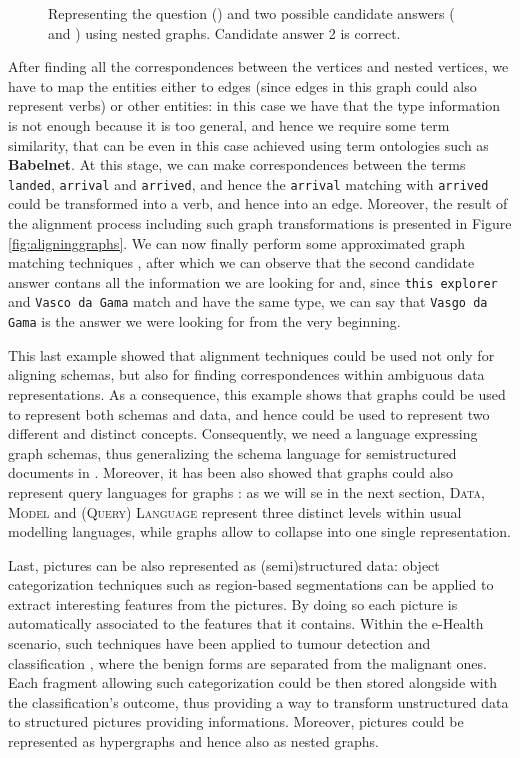 \begin{example}
\begin{figure}[!p]
	\caption{Representing the question () and two possible candidate answers ( and ) using nested graphs. Candidate answer 2 is correct.}
	\label{fig:firstnested}
\end{figure}
	After finding all the correspondences between the vertices and nested vertices, we have to map the  entities either to edges (since edges in this graph could also represent verbs) or other entities: in this case we have that the type information is not enough because it is too general, and hence we require some term similarity, that can be even in this case achieved using term ontologies such as \textbf{Babelnet}. At this stage, we can make correspondences between the terms \texttt{landed}, \texttt{arrival} and \texttt{arrived}, and hence the \texttt{arrival} matching with \texttt{arrived} could be transformed into a verb, and hence into an edge. 
	Moreover, the result of the alignment process including such graph transformations is presented in Figure \ref{fig:aligninggraphs}. We can now finally perform some approximated graph matching techniques \cite{VirgilioMT15,Aligon201520}, after which we can observe that the second candidate answer contans all the information we are looking for and, since \texttt{this explorer} and \texttt{Vasco da Gama} match and have the same type, we can say that \texttt{Vasgo da Gama} is the answer we were looking for from the very beginning.
\end{example}

This last example showed that alignment techniques could  be used not only for aligning schemas, but also for finding correspondences within ambiguous data representations. As a consequence, this example shows that graphs could be used to represent both schemas and data, and hence could be used to represent two different and distinct concepts. Consequently, we need a language expressing graph schemas, thus generalizing the schema language for semistructured documents in \cite{BaaziziLCGS17}. Moreover, it has been also showed that graphs could also represent query languages for graphs \cite{consens1990a,GraphLogAggr,n3,Goertzel2014}: as we will se in the next section, \textsc{Data}, \textsc{Model} and \textsc{(Query) Language} represent three distinct levels within usual modelling languages, while graphs allow to collapse into one single representation.

Last, pictures can be also represented as (semi)structured data: object categorization techniques \cite{Galleguillos10} such as region-based segmentations \cite{NIPS2009_3766} can be applied to extract interesting features from the pictures. By doing so each picture is automatically associated to the features that it contains. Within the e-Health scenario, such techniques have been applied to tumour detection and classification \cite{Rouh15,Rouhi16}, where the benign forms are separated from the malignant ones. Each fragment allowing such categorization could be then stored alongside with the classification's outcome, thus providing a way to transform unstructured data to structured pictures providing informations. Moreover, pictures could be represented as hypergraphs \cite{Bretto2005} and hence also as nested graphs.

